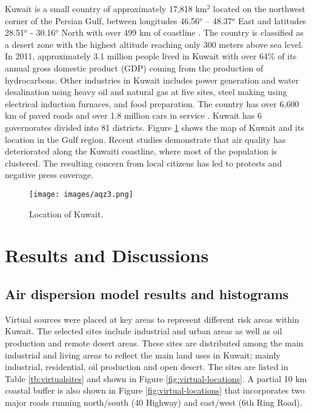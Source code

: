 Kuwait is a small country of approximately 17,818 km$^{2}$  located on the northwest corner of the Persian Gulf, between longitudes 46.56$^{o}$ – 48.37$^{o}$ East and latitudes 28.51$^{o}$ - 30.16$^{o}$ North with over 499 km of coastline \citep{CIA2015}.  The country is classified as a desert zone with the highest altitude reaching only 300 meters above sea level.  In 2011, approximately 3.1 million people lived in Kuwait \citep{CSB2016} with over 64\% of its annual gross domestic product (GDP) coming from the production of hydrocarbons\citep{KAMCO2013}.  Other industries in Kuwait includes power generation and water desalination using heavy oil and natural gas at five sites, steel making using electrical induction furnaces, and food preparation.  The country has over 6,600 km of paved roads and over 1.8 million cars in service \citep{OICA2014}.  Kuwait has 6 governorates divided into 81 districts.  Figure \ref{fig:kuwait} shows the map of Kuwait and its location in the Gulf region.  Recent studies demonstrate that air quality has deteriorated along the Kuwaiti coastline, where most of the population is clustered\citep{Al-Awadhi2014, Al-Yakoob2012}.  The resulting concern from local citizens has led to protests and negative press coverage\citep{Carlisle2010}.
 
%
\begin{figure}
\texttt{[image: images/aqz3.png]} 
\caption{Location of Kuwait.}
\label{fig:kuwait}
\end{figure}
%
\section{Results and Discussions}

\subsection{Air dispersion model results and histograms}

Virtual sources were placed at key areas to represent different risk areas within Kuwait.  The selected sites include industrial and urban areas as well as oil production and remote desert areas. These sites are distributed among the main industrial and living areas to reflect the main land uses in Kuwait; mainly industrial, residential, oil production and open desert.  The sites are listed in Table \ref{tb:virtualsites} and shown in Figure \ref{fig:virtual-locations}. A partial 10 km coastal buffer is also shown in Figure \ref{fig:virtual-locations} that incorporates two major roads running north/south (40 Highway) and east/west (6th Ring Road).

